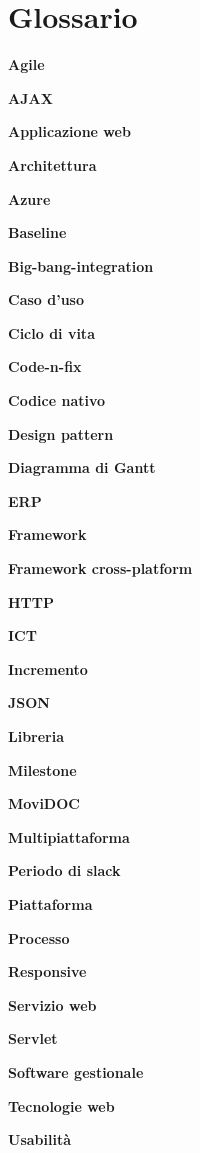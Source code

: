 \chapter{Glossario}

\textbf{Agile}

\textbf{AJAX}

\textbf{Applicazione web}

\textbf{Architettura}

\textbf{Azure}

\textbf{Baseline}

\textbf{Big-bang-integration}

\textbf{Caso d'uso}

\textbf{Ciclo di vita}

\textbf{Code-n-fix}

\textbf{Codice nativo}

\textbf{Design pattern}

\textbf{Diagramma di Gantt}

\textbf{ERP}

\textbf{Framework}

\textbf{Framework cross-platform}

\textbf{HTTP}

\textbf{ICT}

\textbf{Incremento}

\textbf{JSON}

\textbf{Libreria}

\textbf{Milestone}

\textbf{MoviDOC}

\textbf{Multipiattaforma}

\textbf{Periodo di slack}

\textbf{Piattaforma}

\textbf{Processo}

\textbf{Responsive}

\textbf{Servizio web}

\textbf{Servlet}

\textbf{Software gestionale}

\textbf{Tecnologie web}

\textbf{Usabilità}